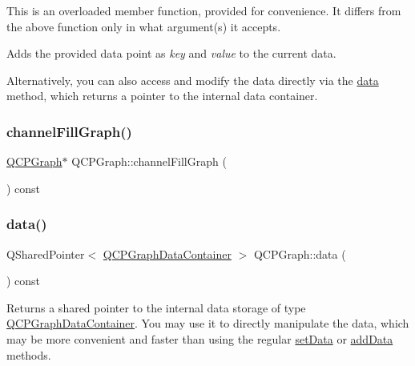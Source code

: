 This is an overloaded member function, provided for convenience. It differs from the above function only in what argument(s) it accepts.

Adds the provided data point as {\itshape key} and {\itshape value} to the current data.

Alternatively, you can also access and modify the data directly via the \hyperlink{class_q_c_p_graph_a141aa31a1f19bbd0ce60f55eaeb9ea60}{data} method, which returns a pointer to the internal data container. \mbox{\label{class_q_c_p_graph_a84277b1655474453a5c83318053414d5}} 
\subsubsection{\texorpdfstring{channel\+Fill\+Graph()}{channelFillGraph()}}
{\footnotesize\ttfamily \hyperlink{class_q_c_p_graph}{Q\+C\+P\+Graph}$\ast$ Q\+C\+P\+Graph\+::channel\+Fill\+Graph (\begin{DoxyParamCaption}{ }\end{DoxyParamCaption}) const\hspace{0.3cm}{\ttfamily [inline]}}

\mbox{\label{class_q_c_p_graph_a141aa31a1f19bbd0ce60f55eaeb9ea60}} 
\subsubsection{\texorpdfstring{data()}{data()}}
{\footnotesize\ttfamily Q\+Shared\+Pointer$<$ \hyperlink{qcustomplot_8h_a2e5583d1ae212f0deb10537cf975a15a}{Q\+C\+P\+Graph\+Data\+Container} $>$ Q\+C\+P\+Graph\+::data (\begin{DoxyParamCaption}{ }\end{DoxyParamCaption}) const\hspace{0.3cm}{\ttfamily [inline]}}

Returns a shared pointer to the internal data storage of type \hyperlink{qcustomplot_8h_a2e5583d1ae212f0deb10537cf975a15a}{Q\+C\+P\+Graph\+Data\+Container}. You may use it to directly manipulate the data, which may be more convenient and faster than using the regular \hyperlink{class_q_c_p_graph_a1eae9429a316b008e2d99b2d65a54395}{set\+Data} or \hyperlink{class_q_c_p_graph_ae0555c0d3fe0fa7cb8628f88158d420f}{add\+Data} methods. \mbox{\label{class_q_c_p_graph_a2a958a5c6a6e1e4a03556be88b6fe37e}} 
